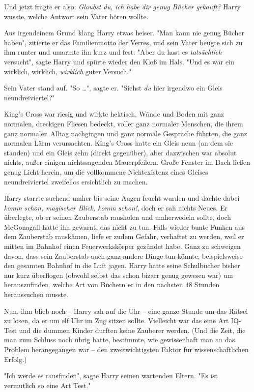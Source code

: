 {Und jetzt fragte er also: \emph{Glaubst du, ich habe dir genug Bücher gekauft?} Harry wusste, welche Antwort sein Vater hören wollte.

Aus irgendeinem Grund klang Harry etwas heiser. "Man kann nie genug Bücher haben", zitierte er das Familienmotto der Verres, und sein Vater beugte sich zu ihm runter und umarmte ihn kurz und fest. "Aber du hast es \emph{tatsächlich} versucht", sagte Harry und spürte wieder den Kloß im Hals. "Und es war ein wirklich, wirklich, \emph{wirklich} guter Versuch."

Sein Vater stand auf. "So …", sagte er. "Siehst \emph{du} hier irgendwo ein Gleis neundreiviertel?"

King's Cross war riesig und wirkte hektisch, Wände und Boden mit ganz normalen, dreckigen Fliesen bedeckt, voller ganz normaler Menschen, die ihrem ganz normalen Alltag nachgingen und ganz normale Gespräche führten, die ganz normalen Lärm verursachten. King's Cross hatte ein Gleis neun (an dem sie standen) und ein Gleis zehn (direkt gegenüber), aber dazwischen war absolut nichts, außer einigen nichtssagenden Mauerpfeilern. Große Fenster im Dach ließen genug Licht herein, um die vollkommene Nichtexistenz eines Gleises neundreiviertel zweifellos ersichtlich zu machen.

Harry starrte suchend umher bis seine Augen feucht wurden und dachte dabei \emph{komm schon, magischer Blick, komm schon!}, doch er sah nichts Neues. Er überlegte, ob er seinen Zauberstab rausholen und umherwedeln sollte, doch McGonagall hatte ihn gewarnt, das nicht zu tun. Falls wieder bunte Funken aus dem Zauberstab rauskämen, liefe er zudem Gefahr, verhaftet zu werden, weil er mitten im Bahnhof einen Feuerwerkskörper gezündet habe. Ganz zu schweigen davon, dass sein Zauberstab auch ganz andere Dinge tun könnte, beispielsweise den gesamten Bahnhof in die Luft jagen. Harry hatte seine Schulbücher bisher nur kurz überflogen (obwohl selbst das schon bizarr genug gewesen war) um herauszufinden, welche Art von Büchern er in den nächsten 48 Stunden heraussuchen musste.

Nun, ihm blieb noch -- Harry sah auf die Uhr -- eine ganze Stunde um das Rätsel zu lösen, da er um elf Uhr im Zug sitzen sollte. Vielleicht war das eine Art IQ-Test und die dummen Kinder durften keine Zauberer werden. (Und die Zeit, die man zum Schluss noch übrig hatte, bestimmte, wie gewissenhaft man an das Problem herangegangen war -- den zweitwichtigsten Faktor für wissenschaftlichen Erfolg.)

"Ich werde es rausfinden", sagte Harry seinen wartenden Eltern. "Es ist vermutlich so eine Art Test."

}
